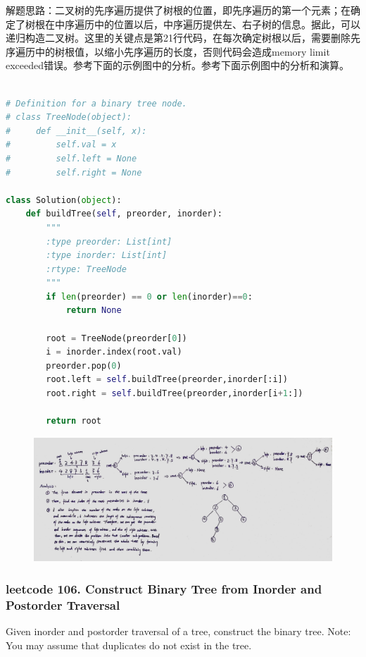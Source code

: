 \documentclass[a4paper,10pt]{article}
\begin{document}
\begin{CJK*}{UTF8}{gbsn}
\noindent 解题思路：二叉树的先序遍历提供了树根的位置，即先序遍历的第一个元素；在确定了树根在中序遍历中的位置以后，中序遍历提供左、右子树的信息。据此，可以递归构造二叉树。这里的关键点是第21行代码，在每次确定树根以后，需要删除先序遍历中的树根值，以缩小先序遍历的长度，否则代码会造成memory limit exceeded错误。参考下面的示例图中的分析。参考下面示例图中的分析和演算。\\
\end{CJK*}

\begin{lstlisting}[language=Python, caption=Problem105. Construct Binary Tree from Preorder and Inorder Traversal]

# Definition for a binary tree node.
# class TreeNode(object):
#     def __init__(self, x):
#         self.val = x
#         self.left = None
#         self.right = None

class Solution(object):
    def buildTree(self, preorder, inorder):
        """
        :type preorder: List[int]
        :type inorder: List[int]
        :rtype: TreeNode
        """
        if len(preorder) == 0 or len(inorder)==0:
            return None
    
        root = TreeNode(preorder[0])
        i = inorder.index(root.val)
        preorder.pop(0)
        root.left = self.buildTree(preorder,inorder[:i])
        root.right = self.buildTree(preorder,inorder[i+1:])
        
        return root
\end{lstlisting}

\begin{figure}[h]
    \includegraphics[width=\textwidth]{leetcode105.jpg}
    \centering \\
\end{figure}


\subsubsection{leetcode 106. Construct Binary Tree from Inorder and Postorder Traversal}
Given inorder and postorder traversal of a tree, construct the binary tree.  Note: You may assume that duplicates do not exist in the tree. \\
\end{document}
